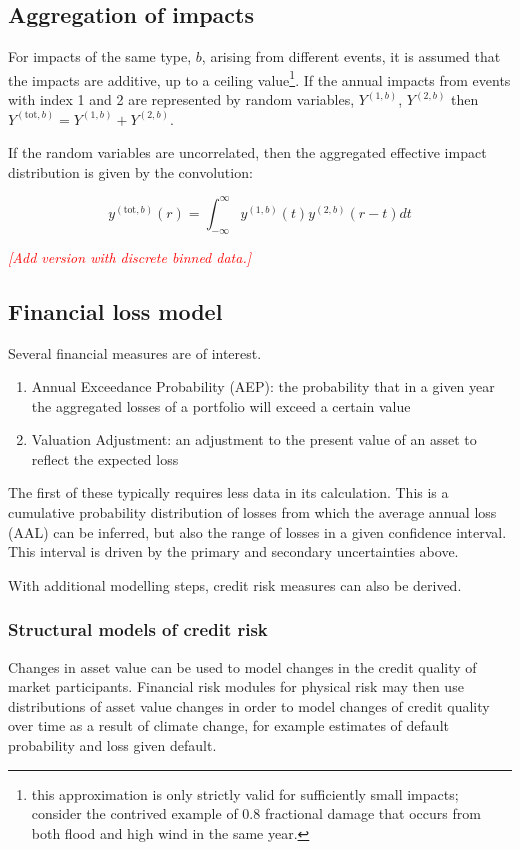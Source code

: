\documentclass[a4paper,11pt]{extarticle} %
\begin{document}
\subsection{Aggregation of impacts}
For impacts of the same type, $b$, arising from different events, it is assumed that the impacts are additive, up to a ceiling value\footnote{this approximation is only strictly valid for sufficiently small impacts; consider the contrived example of 0.8 fractional damage that occurs from both flood and high wind in the same year.}. If the annual impacts from events with index 1 and 2 are represented by random variables, $Y^{(1,b)}$, $Y^{(2,b)}$ then $Y^{(\text{tot}, b)} = Y^{(1,b)} + Y^{(2,b)}$. 

If the random variables are uncorrelated, then the aggregated effective impact distribution is given by the convolution:  

\begin{equation}
	\label{Eq:sampling}
	y^{(\text{tot}, b)}(r) = \int^{\infty}_{-\infty} y^{(1, b)}(t) y^{(2, b)}(r - t) dt
\end{equation} 

{\textcolor{red}{\emph{[Add version with discrete binned data.]}}} 

\subsection{Financial loss model}
Several financial measures are of interest. 

\begin{enumerate}
	\item Annual Exceedance Probability (AEP): the probability that in a given year the aggregated losses of a portfolio will exceed a certain value  
	\item Valuation Adjustment: an adjustment to the present value of an asset to reflect the expected loss 
\end{enumerate}

The first of these typically requires less data in its calculation. This is a cumulative probability distribution of losses from which the average annual loss (AAL) can be inferred, but also the range of losses in a given confidence interval. This interval is driven by the primary and secondary uncertainties above.

With additional modelling steps, credit risk measures can also be derived.

\subsubsection{Structural models of credit risk}
Changes in asset value can be used to model changes in the credit quality of market participants. Financial risk modules for physical risk may then use distributions of asset value changes in order to model changes of credit quality over time as a result of climate change, for example estimates of default probability and loss given default. 
\end{document}
